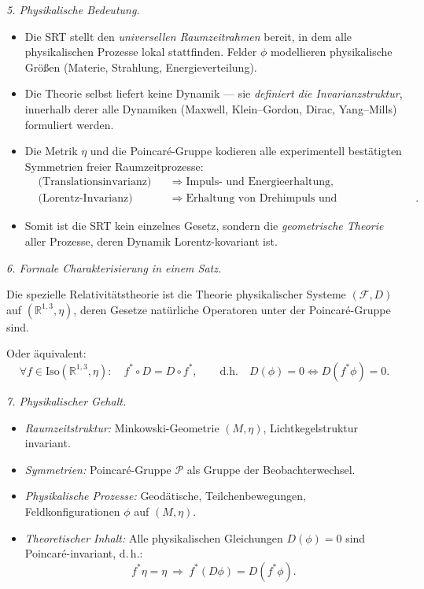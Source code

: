 \documentclass[10pt, letterpaper]{article}
\newcommand{\R}{\mathbb{R}}
\begin{document}
\bigskip
\emph{5. Physikalische Bedeutung.}
\begin{itemize}
\item Die SRT stellt den \emph{universellen Raumzeitrahmen} bereit, in dem 
alle physikalischen Prozesse lokal stattfinden.  
Felder $\phi$ modellieren physikalische Größen (Materie, Strahlung, Energieverteilung).
\item Die Theorie selbst liefert keine Dynamik — sie \emph{definiert die Invarianzstruktur}, 
innerhalb derer alle Dynamiken (Maxwell, Klein–Gordon, Dirac, Yang–Mills) formuliert werden.
\item Die Metrik $\eta$ und die Poincaré-Gruppe kodieren alle experimentell bestätigten 
Symmetrien freier Raumzeitprozesse:
\begin{align*}
&\text{(Translationsinvarianz)} &&\Rightarrow \text{Impuls- und Energieerhaltung},\\
&\text{(Lorentz-Invarianz)} &&\Rightarrow \text{Erhaltung von Drehimpuls und Boostgeneratoren}.
\end{align*}
\item Somit ist die SRT kein einzelnes Gesetz, sondern die \emph{geometrische Theorie} 
aller Prozesse, deren Dynamik Lorentz-kovariant ist.
\end{itemize}

\bigskip
\emph{6. Formale Charakterisierung in einem Satz.}

Die spezielle Relativitätstheorie ist die Theorie physikalischer Systeme $(\mathcal F,D)$ auf $(\R^{1,3},\eta)$, deren Gesetze natürliche Operatoren unter der Poincaré-Gruppe sind.

Oder äquivalent:
\[
\forall f\in\mathrm{Iso}(\R^{1,3},\eta):\quad
f^*\circ D = D\circ f^*,
\qquad
\text{d.h.}\quad D(\phi)=0 \iff D(f^*\phi)=0.
\]

\bigskip
\emph{7. Physikalischer Gehalt.}
\begin{itemize}
\item \emph{Raumzeitstruktur:} Minkowski-Geometrie $(M,\eta)$, Lichtkegelstruktur invariant.
\item \emph{Symmetrien:} Poincaré-Gruppe $\mathcal P$ als Gruppe der Beobachterwechsel.
\item \emph{Physikalische Prozesse:} Geodätische, Teilchenbewegungen, Feldkonfigurationen
$\phi$ auf $(M,\eta)$.
\item \emph{Theoretischer Inhalt:} Alle physikalischen Gleichungen $D(\phi)=0$
sind Poincaré-invariant, d.\,h.:
\[
f^*\eta=\eta \ \Rightarrow\ f^*(D\phi)=D(f^*\phi).
\]
\end{itemize}
\end{document}
